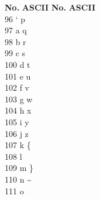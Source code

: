 \documentclass[10pt,landscape,twocolumn,a4paper,notitlepage]{article}
\begin{document}
\begin{tabbing}
\textbf{No.}\hspace{1cm} \=  \textbf{ASCII}\hspace{2cm} \= \textbf{No.}\hspace{1cm} \= \textbf{ASCII}\hspace{2cm}  \\ 
96 \> `  \> p \\
97 \> a  \> q \\
98 \> b  \> r \\
99 \> c  \> s \\
100 \> d  \> t \\
101 \> e  \> u \\
102 \> f  \> v \\
103 \> g  \> w \\
104 \> h  \> x \\
105 \> i  \> y \\
106 \> j  \> z \\
107 \> k  \> \{ \\
108 \> l  \> \textbar \\
109 \> m  \> \} \\
110 \> n  \> \textasciitilde \\
111 \> o  \>  \\  
\end{tabbing}

\newpage
\end{document}
